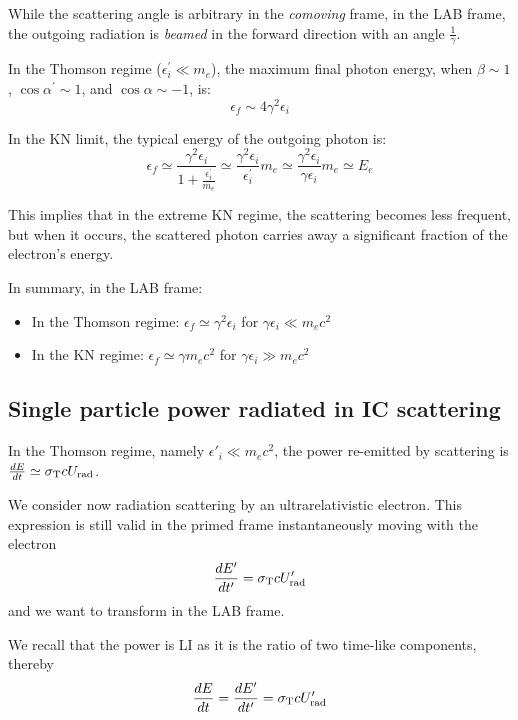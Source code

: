 While the scattering angle is arbitrary in the \emph{comoving} frame, in the LAB frame, the outgoing radiation is \emph{beamed} in the forward direction with an angle \( \frac{1}{\gamma} \).

In the Thomson regime (\( \epsilon^\prime_i \ll m_e \)), the maximum final photon energy, when \( \beta \sim 1 \), \( \cos \alpha^\prime \sim 1 \), and \( \cos \alpha \sim - 1 \), is:
%
\[
\epsilon_{f} \sim 4 \gamma^2 \epsilon_i
\]

In the KN limit, the typical energy of the outgoing photon is:
%
\[
\epsilon_f \simeq \frac{\gamma^2 \epsilon_i}{1 + \frac{\epsilon^\prime_i}{m_e}} \simeq \frac{\gamma^2 \epsilon_i}{\epsilon^\prime_i} m_e \simeq \frac{\gamma^2 \epsilon_i}{\gamma \epsilon_i} m_e \simeq E_e
\]

This implies that in the extreme KN regime, the scattering becomes less frequent, but when it occurs, the scattered photon carries away a significant fraction of the electron's energy.

\begin{remark}
In summary, in the LAB frame:
%
\begin{itemize}
\item In the Thomson regime: \( \epsilon_f \simeq \gamma^2 \epsilon_i \) for \( \gamma \epsilon_i \ll m_e c^2 \)
\item In the KN regime: \( \epsilon_f \simeq \gamma m_e c^2 \) for \( \gamma \epsilon_i \gg m_e c^2 \)
\end{itemize}
\end{remark}

\subsection{Single particle power radiated in IC scattering}

In the Thomson regime, namely $\epsilon'_i \ll m_e c^2$, the power re-emitted by scattering is $\frac{dE}{dt} \simeq \sigma_{\rm T} c U_{\rm rad}$.

We consider now radiation scattering by an ultrarelativistic electron. This expression is still valid in the primed frame instantaneously moving with the electron
%
\begin{equation*}
\frac{dE'}{dt'} = \sigma_{\rm T} c U'_{\rm rad}
\end{equation*}
%
and we want to transform in the LAB frame.

 We recall that the power is LI as it is the ratio of two time-like components, thereby
\begin{equation*}
 \frac{dE}{dt} = \frac{dE'}{dt'} = \sigma_{\rm T} c U'_{\rm rad}
\end{equation*}

